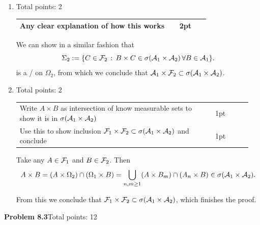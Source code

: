 \documentclass{lecturenotes}
\newcommand{\rubric}[1]{#1}
\begin{document}
\begin{enumerate}[label={(\alph*)}]
{}

Note that $\cA_1 \subset \Sigma_1 \subset \cF_1$. From which it follows that $\Sigma_1 = \cF_1$. 

But then, from the definition of $\Sigma_1$ we have that $\cF_1 \times \cA_2 \subset \sigma(\cA_1 \times \cA_2)$.
\item \rubric{ Total points: 2 \hfill

\begin{tabular}{p{0.8\linewidth}p{0.15\linewidth}}
\hline
Any clear explanation of how this works & 2pt\\
\hline
\end{tabular}

}
We can show in a similar fashion that
\[
	\Sigma_2 := \{C \in \mathcal F_2 \, : \, B \times C \in \sigma(\mathcal A_1 \times \mathcal A_2) \, \forall B \in \mathcal A_1\}.
\]
is a \sigalg/ on $\Omega_2$, from which we conclude that $\mathcal A_1 \times \mathcal F_2 \subset \sigma(\mathcal A_1 \times \mathcal A_2)$.
\item \rubric{ Total points: 2 \hfill

\begin{tabular}{p{0.8\linewidth}p{0.15\linewidth}}
\hline
Write $A \times B$ as intersection of know measurable sets to show it is in $\sigma(\mathcal A_1 \times \mathcal A_2)$ & 1pt\\
Use this to show inclusion $\mathcal F_1 \times \mathcal F_2 \subset \sigma(\mathcal A_1 \times \mathcal A_2)$ and conclude & 1pt\\
\hline
\end{tabular}

}
Take any $A \in \mathcal F_1$ and $B \in \mathcal F_2$. Then
\[
	A \times B = (A \times \Omega_2) \cap (\Omega_1 \times B) = \bigcup_{n,m \ge 1} (A \times B_m) \cap (A_n \times B) \in \sigma(\mathcal A_1 \times \mathcal A_2).
\]

From this we conclude that $\mathcal F_1 \times \mathcal F_2 \subset \sigma(\mathcal A_1 \times \mathcal A_2)$, which finishes the proof.
\end{enumerate}

\bigskip

\textbf{Problem 8.3}\rubric{Total points: 12}
\end{document}
